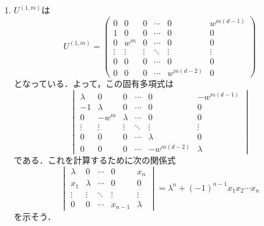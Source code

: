 \documentclass[a4paper,pdflatex,ja=standard]{bxjsarticle}
\begin{document}
\begin{enumerate}
  \item 
  $U^{(1,m)}$は
  \begin{equation}
    U^{(1,m)}
    =
    \begin{pmatrix}
      0 & 0 & 0 & \cdots & 0 & w^{m(d-1)} \\
      1 & 0 & 0 & \cdots & 0 & 0 \\
      0 & w^{m} & 0 & \cdots & 0 & 0 \\
      \vdots & \vdots & \vdots & \ddots & \vdots & \vdots \\
      0 & 0 & 0 & \cdots & 0 & 0 \\
      0 & 0 & 0 & \cdots & w^{m(d-2)} & 0 
    \end{pmatrix}
  \end{equation}
  となっている．よって，この固有多項式は
  \begin{equation}
    \begin{vmatrix}
      \lambda & 0 & 0 & \cdots & 0 & -w^{m(d-1)} \\
      -1 & \lambda & 0 & \cdots & 0 & 0 \\
      0 & -w^{m} & \lambda & \cdots & 0 & 0 \\
      \vdots & \vdots & \vdots & \ddots & \vdots & \vdots \\
      0 & 0 & 0 & \cdots & \lambda & 0 \\
      0 & 0 & 0 & \cdots & -w^{m(d-2)} & \lambda 
    \end{vmatrix}
  \end{equation}
  である．これを計算するために次の関係式
  \begin{equation}
    \begin{vmatrix}
      \lambda & 0 & \cdots & 0&x_{n} \\
      x_1 & \lambda & \cdots & 0&0 \\
      \vdots & \vdots & \ddots & \vdots & \vdots \\
      0 & 0 & \cdots & x_{n-1} & \lambda
    \end{vmatrix}
    =
    \lambda^{n}+(-1)^{n-1}x_{1}x_{2}\cdots x_{n}
    \label{lem}
  \end{equation}
  を示そう．


\end{enumerate}
\end{document}
